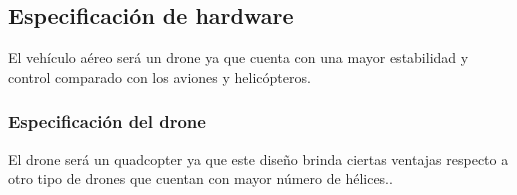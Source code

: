 
\subsection{Especificación de hardware}

El vehículo aéreo será un drone ya que cuenta con una mayor estabilidad y control comparado con los aviones y helicópteros.

\subsubsection{Especificación del drone}

El drone será un quadcopter ya que este diseño brinda ciertas ventajas respecto 
a otro tipo de drones que cuentan con mayor número de hélices..
